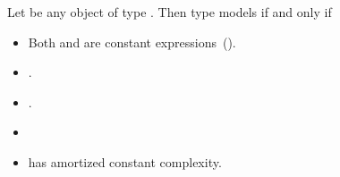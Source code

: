 \begin{addedblock}
\pnum
Let  be any object of type . Then type  models
 if and only if

\begin{itemize}
\item Both  and  are constant expressions~().
\item {}.
\item {}.
\item {}
\item {} has amortized constant complexity.
\end{itemize}

\end{addedblock}
